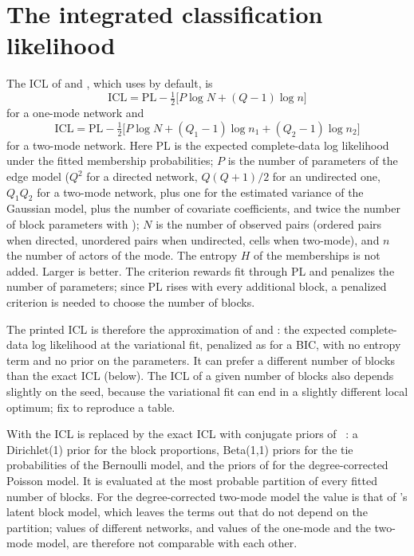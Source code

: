 \section{The integrated classification likelihood}\label{sec:icl}
The ICL of \blockmodels{} and \sbmR{}, which \nwsbm{} uses by default, is
\[ \mathrm{ICL}=\mathrm{PL}-\tfrac12\Big[P\log N+(Q-1)\log n\Big] \]
for a one-mode network and
\[ \mathrm{ICL}=\mathrm{PL}-\tfrac12\Big[P\log N+(Q_1-1)\log n_1+(Q_2-1)\log n_2\Big] \]
for a two-mode network. Here PL is the expected complete-data log likelihood under the fitted membership probabilities; $P$ is the number of parameters of the edge model ($Q^2$ for a directed network, $Q(Q+1)/2$ for an undirected one, $Q_1Q_2$ for a two-mode network, plus one for the estimated variance of the Gaussian model, plus the number of covariate coefficients, and twice the number of block parameters with ); $N$ is the number of observed pairs (ordered pairs when directed, unordered pairs when undirected, cells when two-mode), and $n$ the number of actors of the mode. The entropy $H$ of the memberships is not added. Larger is better. The criterion rewards fit through PL and penalizes the number of parameters; since PL rises with every additional block, a penalized criterion is needed to choose the number of blocks.

The printed ICL is therefore the approximation of \blockmodels{} and \sbmR{}: the expected complete-data log likelihood at the variational fit, penalized as for a BIC, with no entropy term and no prior on the parameters. It can prefer a different number of blocks than the exact ICL (below). The ICL of a given number of blocks also depends slightly on the seed, because the variational fit can end in a slightly different local optimum; fix  to reproduce a table.

With  the ICL is replaced by the exact ICL with conjugate priors of \greed{}~\cite{come2021}: a Dirichlet(1) prior for the block proportions, Beta(1,1) priors for the tie probabilities of the Bernoulli model, and the priors of \greed{} for the degree-corrected Poisson model. It is evaluated at the most probable partition of every fitted number of blocks. For the degree-corrected two-mode model the value is that of \greed{}'s latent block model, which leaves the terms out that do not depend on the partition; values of different networks, and values of the one-mode and the two-mode model, are therefore not comparable with each other.

